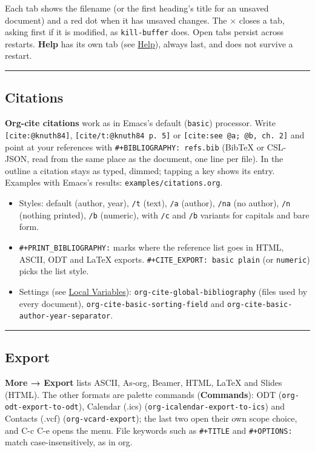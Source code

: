 \documentclass[11pt]{article}
\begin{document}
Each tab shows the filename (or the first heading's title for an unsaved document) and a red dot when it has unsaved changes. The × closes a tab, asking first if it is modified, as \texttt{kill-buffer} does. Open tabs persist across restarts. \textbf{Help} has its own tab (see \hyperref[sec:org65b75d7]{Help}), always last, and does not survive a restart.

\noindent\rule{\textwidth}{0.5pt}

\subsection{Citations}
\label{sec:org1a3b79e}
\textbf{Org-cite citations} work as in Emacs's default (\texttt{basic}) processor. Write \texttt{[cite:@knuth84]}, \texttt{[cite/t:@knuth84 p. 5]} or \texttt{[cite:see @a; @b, ch. 2]} and point at your references with \texttt{\#+BIBLIOGRAPHY: refs.bib} (BibTeX or CSL-JSON, read from the same place as the document, one line per file). In the outline a citation stays as typed, dimmed; tapping a key shows its entry. Examples with Emacs's results: \texttt{examples/citations.org}.

\begin{itemize}
\item Styles: default (author, year), \texttt{/t} (text), \texttt{/a} (author), \texttt{/na} (no author), \texttt{/n} (nothing printed), \texttt{/b} (numeric), with \texttt{/c} and \texttt{/b} variants for capitals and bare form.
\item \texttt{\#+PRINT\_BIBLIOGRAPHY:} marks where the reference list goes in HTML, ASCII, ODT and \LaTeX{} exports. \texttt{\#+CITE\_EXPORT: basic plain} (or \texttt{numeric}) picks the list style.
\item Settings (see \hyperref[sec:org761a631]{Local Variables}): \texttt{org-cite-global-bibliography} (files used by every document), \texttt{org-cite-basic-sorting-field} and \texttt{org-cite-basic-author-year-separator}.
\end{itemize}

\noindent\rule{\textwidth}{0.5pt}

\subsection{Export}
\label{sec:org9a53e51}
\textbf{More → Export} lists ASCII, As-org, Beamer, HTML, \LaTeX{} and Slides (HTML). The other formats are palette commands (\textbf{Commands}): ODT (\texttt{org-odt-export-to-odt}), Calendar (.ics) (\texttt{org-icalendar-export-to-ics}) and Contacts (.vcf) (\texttt{org-vcard-export}); the last two open their own scope choice, and C-c C-e opens the menu. File keywords such as \texttt{\#+TITLE} and \texttt{\#+OPTIONS:} match case-insensitively, as in org.
\end{document}
